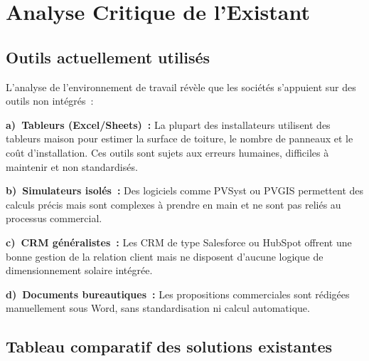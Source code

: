 \section{Analyse Critique de l'Existant}

\subsection{Outils actuellement utilisés}

L'analyse de l'environnement de travail révèle que les sociétés s'appuient
sur des outils non intégrés~:

\textbf{a)~Tableurs (Excel/Sheets)~:} La plupart des installateurs utilisent
des tableurs maison pour estimer la surface de toiture, le nombre de panneaux
et le coût d'installation. Ces outils sont sujets aux erreurs humaines, difficiles
à maintenir et non standardisés.

\textbf{b)~Simulateurs isolés~:} Des logiciels comme PVSyst ou PVGIS permettent
des calculs précis mais sont complexes à prendre en main et ne sont pas reliés
au processus commercial.

\textbf{c)~CRM généralistes~:} Les CRM de type Salesforce ou HubSpot offrent
une bonne gestion de la relation client mais ne disposent d'aucune logique
de dimensionnement solaire intégrée.

\textbf{d)~Documents bureautiques~:} Les propositions commerciales sont rédigées
manuellement sous Word, sans standardisation ni calcul automatique.

\subsection{Tableau comparatif des solutions existantes}

